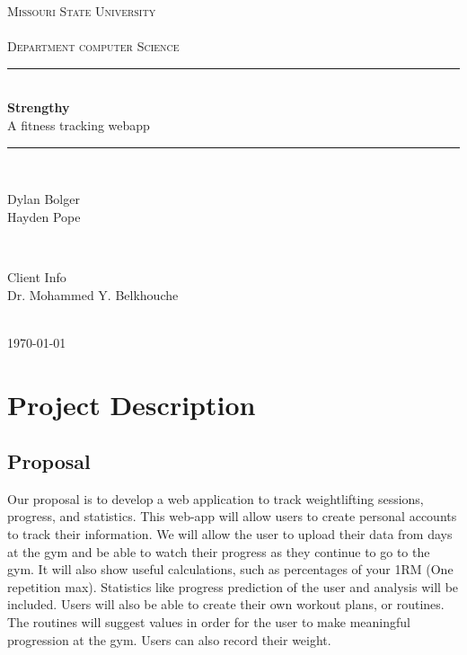 \documentclass[12pt]{article}
\begin{document}
\begin{titlepage}

\newcommand{\HRule}{\rule{\linewidth}{0.5mm}}

\center

\textsc{\LARGE Missouri State University\\~\\Department computer Science}\\[1.0cm]

\HRule \\[0.4cm]
{ \huge \bfseries Strengthy}\\[0.4cm]
{ \large A fitness tracking webapp}\\[0.4cm]
\HRule \\[1.5cm]

\begin{minipage}{0.4\textwidth}
\begin{flushleft} \large
Dylan Bolger \\ Hayden Pope
\end{flushleft}
\end{minipage}
~
\begin{minipage}{0.4\textwidth}
\begin{flushright} \large
Client Info \\
Dr. Mohammed Y. Belkhouche\\

\end{flushright}
\end{minipage}\\[2cm]

{\large \today}\\[2cm]

\end{titlepage}

\newpage
\tableofcontents

\newpage

\section{Project Description}
\subsection{Proposal}
Our proposal is to develop a web application to track weightlifting sessions, progress, and statistics. This web-app will allow users to create personal accounts to track their information. We will allow the user to upload their data from days at the gym and be able to watch their progress as they continue to go to the gym. It will also show useful calculations, such as percentages of your 1RM (One repetition max). Statistics like progress prediction of the user and analysis will be included. Users will also be able to create their own workout plans, or routines. The routines will suggest values in order for the user to make meaningful progression at the gym. Users can also record their weight.
\end{document}
